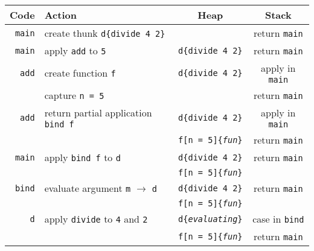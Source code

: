 \documentclass[en]{pracamgr}
\begin{document}
\begin{center}
\begin{tabular}{r | l | c | c }
    Code & Action & Heap & Stack \\
    \hline
    \hline
    \texttt{main} & create thunk \texttt{d\{divide 4 2\}} &  & return \texttt{main} \\
    \hline
    \texttt{main} & apply \texttt{add} to \texttt{5} & \texttt{d\{divide 4 2\}} & return \texttt{main} \\
    \hline
    \texttt{add} & create function \texttt{f} & \texttt{d\{divide 4 2\}} & apply in \texttt{main} \\
    & capture \texttt{n = 5} & & return \texttt{main} \\
    \hline
    \texttt{add} & return partial application \texttt{bind f} & \texttt{d\{divide 4 2\}} & apply in \texttt{main} \\
    & & \texttt{f[n = 5]\{\textit{fun}\}} & return \texttt{main} \\
    \hline
    \texttt{main} & apply \texttt{bind f} to \texttt{d} & \texttt{d\{divide 4 2\}} & return \texttt{main} \\
    & & \texttt{f[n = 5]\{\textit{fun}\}} & \\
    \hline
    \texttt{bind} & evaluate argument \texttt{m} $\rightarrow$ \texttt{d} & \texttt{d\{divide 4 2\}} & return \texttt{main} \\
    & & \texttt{f[n = 5]\{\textit{fun}\}} & \\
    \hline
    \texttt{d} & apply \texttt{divide} to \texttt{4} and \texttt{2} & \texttt{d\{\textit{evaluating}\}} & case in \texttt{bind} \\
    & & \texttt{f[n = 5]\{\textit{fun}\}} & return \texttt{main} \\
    \hline
\end{tabular}
\end{center}
\end{document}
